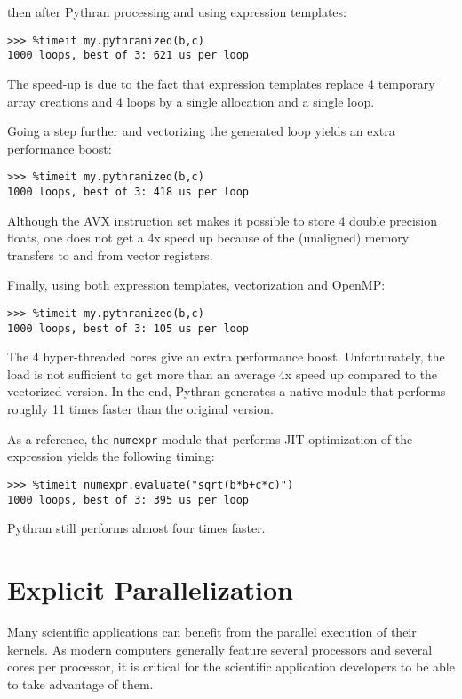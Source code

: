 \documentclass[10pt, onecolumn, preprint]{sigplanconf}
\begin{document}
\noindent then after Pythran processing and using expression templates:

\begin{lstlisting}
>>> %timeit my.pythranized(b,c)
1000 loops, best of 3: 621 us per loop
\end{lstlisting}

The speed-up is due to the fact that expression templates replace 4 temporary
array creations and 4 loops by a single allocation and a single loop.

Going a step further and vectorizing the generated loop yields an extra
performance boost:

\begin{lstlisting}
>>> %timeit my.pythranized(b,c)
1000 loops, best of 3: 418 us per loop
\end{lstlisting}

Although the AVX instruction set makes it possible to store 4 double precision
floats, one does not get a 4x speed up because of the (unaligned) memory transfers
to and from vector registers.

Finally, using both expression templates, vectorization and OpenMP:

\begin{lstlisting}
>>> %timeit my.pythranized(b,c)
1000 loops, best of 3: 105 us per loop
\end{lstlisting}

The 4 hyper-threaded cores give an extra performance boost. Unfortunately, the
load is not sufficient to get more than an average 4x speed up compared to the
vectorized version. In the end, Pythran generates a native module that performs
roughly 11 times faster than the original version.

As a reference, the \texttt{numexpr} module that performs JIT optimization of the
expression yields the following timing:

\begin{lstlisting}
>>> %timeit numexpr.evaluate("sqrt(b*b+c*c)")
1000 loops, best of 3: 395 us per loop
\end{lstlisting}

\noindent Pythran still performs almost four times faster.

\section{Explicit Parallelization}
\label{sec:openmp}

Many scientific applications can benefit from the parallel execution of their
kernels. As modern computers generally feature several processors and several
cores per processor, it is critical for the scientific application developers to
be able to take advantage of them.
\end{document}
